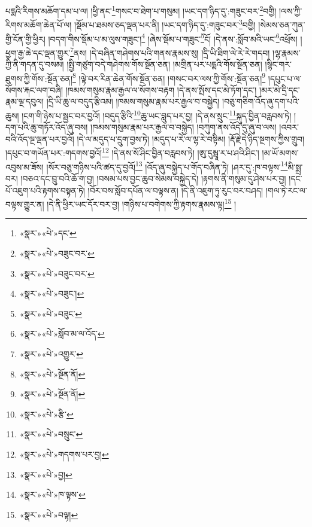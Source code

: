 པདྨའི་རིགས་མཆོག་དམ་པ་ལ། །ཕྱི་ནང་\footnote{«སྣར་»«པེ་»དང་}གསང་བ་ཐེག་པ་གསུམ། །ཡང་དག་ཉིད་དུ་:གཟུང་བར་\footnote{«སྣར་»«པེ་»བཟུང་བར་}བགྱི། །ལས་ཀྱི་རིགས་མཆོག་ཆེན་པོ་ལ། །སྡོམ་པ་ཐམས་ཅད་ལྡན་པར་ནི། །ཡང་དག་ཉིད་དུ་:གཟུང་བར་\footnote{«སྣར་»«པེ་»བཟུང་བར་}བགྱི། །སེམས་ཅན་ཀུན་གྱི་ངོན་གྱི་ཕྱིར། །བདག་གིས་སྡོམ་པ་མ་ལུས་གཟུང་།\footnote{«སྣར་»«པེ་»བཟུང་།} །ཞེས་སྡོམ་པ་གཟུང་\footnote{«སྣར་»«པེ་»བཟུང་}ངོ། །དེ་ནས་:སློབ་མའི་ཡང་\footnote{«སྣར་»«པེ་»སློབ་མ་ལ་འོད་}འཕྲོས། །ཕྱག་རྒྱ་ཆེ་དང་ལྡན་གྱུར་\footnote{«སྣར་»«པེ་»འགྱུར་}ནས། །དེ་བཞིན་གཤེགས་པའི་གནས་རྣམས་སུ། །དྲི་ཡི་ཐིག་ལེ་རེ་རེ་གདབ། །ལྷ་རྣམས་ཀྱི་ནི་གདན་དུ་བསམ། །སྤྱི་གཙུག་བདེ་གཤེགས་གོས་སྔོན་ཅན། །མགྲིན་པར་པདྨའི་གོས་སྔོན་ཅན། །སྙིང་གར་ཐུགས་ཀྱི་གོས་:སྔོན་ཅན།\footnote{«སྣར་»«པེ་»སྔོན་ནོ།} །ལྟེ་བར་རིན་ཆེན་གོས་སྔོན་ཅན། །གསང་བར་ལས་ཀྱི་གོས་:སྔོན་ཅན།\footnote{«སྣར་»«པེ་»སྔོན་ནོ།} །དཔུང་པ་ལ་སོགས་རྐང་ལག་བཞི། །ཁམས་གསུམ་རྣམ་རྒྱལ་ལ་སོགས་བརྟག །དེ་ནས་སྤོས་དང་མེ་ཏོག་དང་། །མར་མེ་དྲི་དང་རྣམ་ལྔ་དབུལ། །དྲི་ཡི་ཆུ་ལ་བདུད་རྩིའམ། །ཁམས་གསུམ་རྣམ་པར་རྒྱལ་བ་བསྐྱེད། །བཅུ་གཅིག་འོད་ཞུ་དག་པའི་ཆུས། །ངག་གི་ཉེས་པ་སྦྱང་བར་བྱའོ། །བདུད་རྩིའི་\footnote{«སྣར་»«པེ་»རྩི་}ཆུ་ཡང་བླུད་པར་བྱ། །དེ་ནས་སྲུང་\footnote{«སྣར་»«པེ་»བསྲུང་}སྐུད་བྱིན་བརླབས་ཏེ། །དག་པའི་ཆུ་གཏོར་འོད་ཞུ་བས། །ཁམས་གསུམ་རྣམ་པར་རྒྱལ་བ་བསྐྱེད། །བཀུག་ནས་འོད་དུ་ཞུ་བ་ལས། །འབར་བའི་འོད་ལྔ་ལྡན་པར་བྱའོ། །དེ་ལ་མདུད་པ་དྲུག་བྱས་ཏེ། །མདུད་པ་རེ་ལ་ལྷ་རེ་བསྟིམ། །རྡོ་རྗེ་དེ་ཉིད་སྔགས་ཀྱིས་གྲུབ། །དཔུང་བ་གཡོན་པར་:གདགས་བྱའོ།\footnote{«སྣར་»«པེ་»གདགས་པར་བྱ།} །དེ་ནས་སོ་ཤིང་བྱིན་བརླབས་ཏེ། །ཨུ་དུམྦཱ་ར་པ་ཤའི་ཤིང་། །མ་ཡོ་མགས་འབུས་མ་ཟོས། །སོར་བཅུ་གཉིས་པའི་ཚད་དུ་བྱའོ།\footnote{«སྣར་»«པེ་»བྱ།} །འོད་ཞུ་བསྐྱེད་པ་གོད་བཞིན་ཏེ། །ཤར་དུ་:ཁ་བལྟས་\footnote{«སྣར་»«པེ་»ཁ་ལྟས་}མི་སྨྲ་བར། །བཅའ་དང་བྲུ་བའི་ཆོ་ག་བྱ། །བསམ་པས་བྱང་ཆུབ་སེམས་བསྐྱེད་དེ། །རྟགས་ནི་གསུམ་དུ་ཤེས་པར་བྱ། །དང་པོ་འཇུག་པའི་རྟགས་བསྟན་ཏེ། །བོར་བས་སློབ་དཔོན་ལ་བལྟས་ན། །དེ་ནི་འཇུག་ཏུ་རུང་བར་བཤད། །གལ་ཏེ་རང་ལ་བལྟས་གྱུར་ན། །དེ་ནི་ཕྱིར་ཡང་དོར་བར་བྱ། །གཉིས་པ་བགེགས་ཀྱི་རྟགས་རྣམས་ལྟ།\footnote{«སྣར་»«པེ་»བལྟ།} །
